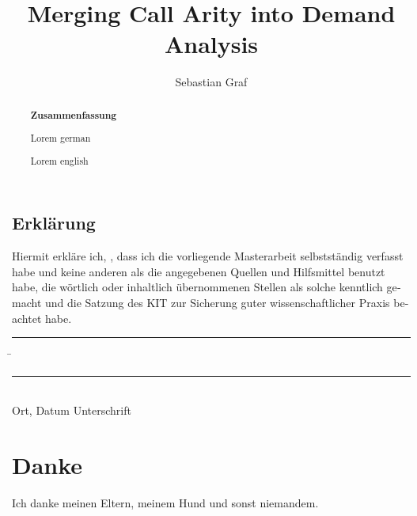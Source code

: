 \documentclass[parskip=full,12pt,a4paper,twoside,headings=openright]{scrreprt}
\title{Merging Call Arity into Demand Analysis}
\author{Sebastian Graf}
\begin{document}
\begin{otherlanguage}{ngerman} %
\mytitlepage
\end{otherlanguage}

\begin{abstract}
\begin{center}\Huge\textbf{\textsf{Zusammenfassung}}
\end{center}
\vfill

Lorem german
\vfill

Lorem english
\vfill

\end{abstract}

\tableofcontents

%

%
%
%




\begin{otherlanguage}{ngerman}
\chapter*{Erklärung}
\pagestyle{empty}

  \vspace{20mm}
  Hiermit erkläre ich, \theauthor, dass ich die vorliegende Masterarbeit selbst\-ständig
verfasst habe und keine anderen als die angegebenen Quellen und Hilfsmittel
benutzt habe, die wörtlich oder inhaltlich übernommenen Stellen als solche kenntlich gemacht und
die Satzung des KIT zur Sicherung guter wissenschaftlicher Praxis beachtet habe.
  \vspace{20mm}
  \begin{tabbing}
  \rule{4cm}{.4pt}\hspace{1cm} \= \rule{7cm}{.4pt} \\
 Ort, Datum \> Unterschrift
  \end{tabbing}
\end{otherlanguage}

\chapter*{Danke}
\pagestyle{empty}

Ich danke meinen Eltern, meinem Hund und sonst niemandem.

\pagestyle{fancy}
\appendix

%
\end{document}
